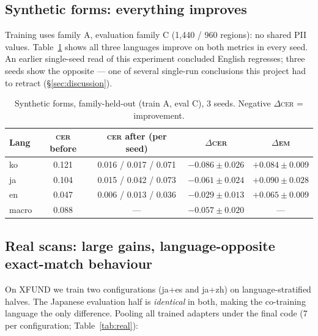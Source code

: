 \documentclass[11pt]{article}
\newcommand{\cer}{\textsc{cer}}
\newcommand{\EM}{\textsc{em}}
\begin{document}
\subsection{Synthetic forms: everything improves}\label{sec:adapt-syn}

Training uses family A, evaluation family C (1{,}440 / 960 regions): no
shared PII values. Table~\ref{tab:syn} shows all three languages improve on
both metrics in every seed. An earlier single-seed read of this experiment
concluded English regresses; three seeds show the opposite --- one of several
single-run conclusions this project had to retract (\S\ref{sec:discussion}).

\begin{table}[t]
\centering\small
\caption{Synthetic forms, family-held-out (train A, eval C), 3 seeds.
Negative $\Delta$\cer{} = improvement.}
\label{tab:syn}
\begin{tabular}{lcccc}
\toprule
Lang & \cer{} before & \cer{} after (per seed) & $\Delta$\cer{} & $\Delta$\EM{} \\
\midrule
ko & 0.121 & 0.016 / 0.017 / 0.071 & $-0.086\pm0.026$ & $+0.084\pm0.009$ \\
ja & 0.104 & 0.015 / 0.042 / 0.073 & $-0.061\pm0.024$ & $+0.090\pm0.028$ \\
en & 0.047 & 0.006 / 0.013 / 0.036 & $-0.029\pm0.013$ & $+0.065\pm0.009$ \\
\midrule
macro & 0.088 & --- & $-0.057\pm0.020$ & --- \\
\bottomrule
\end{tabular}
\end{table}

\subsection{Real scans: large gains, language-opposite exact-match
behaviour}\label{sec:adapt-real}

On XFUND we train two configurations (ja+es and ja+zh) on
language-stratified halves. The Japanese evaluation half is \emph{identical}
in both, making the co-training language the only difference. Pooling all
trained adapters under the final code (7 per configuration;
Table~\ref{tab:real}):
\end{document}
